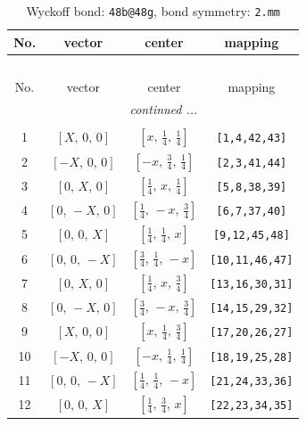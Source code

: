 \documentclass[fleqn,8pt]{jsarticle}
\begin{document}
\renewcommand{\arraystretch}{1.2}
\begin{longtable}{cccc}
\caption{Wyckoff bond: {\tt 48b@48g}, bond symmetry: {\tt 2.mm}}
 \\
 \hline \hline
No. & vector & center & mapping \\ \hline \endfirsthead

\multicolumn{3}{l}{\tablename\ \thetable{}} \\
 \hline \hline
No. & vector & center & mapping \\ \hline \endhead

 \hline \hline
\multicolumn{3}{r}{\footnotesize\it continued ...} \\ \endfoot

 \hline \hline
\multicolumn{3}{r}{} \\ \endlastfoot

1 & $\left[ X,\, 0,\, 0 \right]$ & $\left[ x,\, \frac{1}{4},\, \frac{1}{4} \right]$ & {\tt [1,4,42,43]} \\ \hline
2 & $\left[ - X,\, 0,\, 0 \right]$ & $\left[ - x,\, \frac{3}{4},\, \frac{1}{4} \right]$ & {\tt [2,3,41,44]} \\ \hline
3 & $\left[ 0,\, X,\, 0 \right]$ & $\left[ \frac{1}{4},\, x,\, \frac{1}{4} \right]$ & {\tt [5,8,38,39]} \\ \hline
4 & $\left[ 0,\, - X,\, 0 \right]$ & $\left[ \frac{1}{4},\, - x,\, \frac{3}{4} \right]$ & {\tt [6,7,37,40]} \\ \hline
5 & $\left[ 0,\, 0,\, X \right]$ & $\left[ \frac{1}{4},\, \frac{1}{4},\, x \right]$ & {\tt [9,12,45,48]} \\ \hline
6 & $\left[ 0,\, 0,\, - X \right]$ & $\left[ \frac{3}{4},\, \frac{1}{4},\, - x \right]$ & {\tt [10,11,46,47]} \\ \hline
7 & $\left[ 0,\, X,\, 0 \right]$ & $\left[ \frac{1}{4},\, x,\, \frac{3}{4} \right]$ & {\tt [13,16,30,31]} \\ \hline
8 & $\left[ 0,\, - X,\, 0 \right]$ & $\left[ \frac{3}{4},\, - x,\, \frac{3}{4} \right]$ & {\tt [14,15,29,32]} \\ \hline
9 & $\left[ X,\, 0,\, 0 \right]$ & $\left[ x,\, \frac{1}{4},\, \frac{3}{4} \right]$ & {\tt [17,20,26,27]} \\ \hline
10 & $\left[ - X,\, 0,\, 0 \right]$ & $\left[ - x,\, \frac{1}{4},\, \frac{1}{4} \right]$ & {\tt [18,19,25,28]} \\ \hline
11 & $\left[ 0,\, 0,\, - X \right]$ & $\left[ \frac{1}{4},\, \frac{1}{4},\, - x \right]$ & {\tt [21,24,33,36]} \\ \hline
12 & $\left[ 0,\, 0,\, X \right]$ & $\left[ \frac{1}{4},\, \frac{3}{4},\, x \right]$ & {\tt [22,23,34,35]} \\
\end{longtable}
\end{document}
